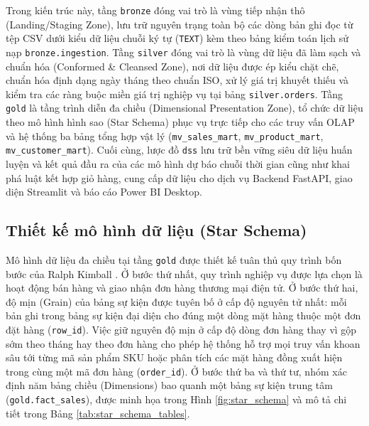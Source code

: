 Trong kiến trúc này, tầng \texttt{bronze} đóng vai trò là vùng tiếp nhận thô (Landing/Staging Zone), lưu trữ nguyên trạng toàn bộ các dòng bản ghi đọc từ tệp CSV dưới kiểu dữ liệu chuỗi ký tự (\texttt{TEXT}) kèm theo bảng kiểm toán lịch sử nạp \texttt{bronze.ingestion}. Tầng \texttt{silver} đóng vai trò là vùng dữ liệu đã làm sạch và chuẩn hóa (Conformed \& Cleansed Zone), nơi dữ liệu được ép kiểu chặt chẽ, chuẩn hóa định dạng ngày tháng theo chuẩn ISO, xử lý giá trị khuyết thiếu và kiểm tra các ràng buộc miền giá trị nghiệp vụ tại bảng \texttt{silver.orders}. Tầng \texttt{gold} là tầng trình diễn đa chiều (Dimensional Presentation Zone), tổ chức dữ liệu theo mô hình hình sao (Star Schema) phục vụ trực tiếp cho các truy vấn OLAP và hệ thống ba bảng tổng hợp vật lý (\texttt{mv\_sales\_mart}, \texttt{mv\_product\_mart}, \texttt{mv\_customer\_mart}). Cuối cùng, lược đồ \texttt{dss} lưu trữ bền vững siêu dữ liệu huấn luyện và kết quả đầu ra của các mô hình dự báo chuỗi thời gian cũng như khai phá luật kết hợp giỏ hàng, cung cấp dữ liệu cho dịch vụ Backend FastAPI, giao diện Streamlit và báo cáo Power BI Desktop.

\subsection{Thiết kế mô hình dữ liệu (Star Schema)}

Mô hình dữ liệu đa chiều tại tầng \texttt{gold} được thiết kế tuân thủ quy trình bốn bước của Ralph Kimball \cite{kimball2013}. Ở bước thứ nhất, quy trình nghiệp vụ được lựa chọn là hoạt động bán hàng và giao nhận đơn hàng thương mại điện tử. Ở bước thứ hai, độ mịn (Grain) của bảng sự kiện được tuyên bố ở cấp độ nguyên tử nhất: mỗi bản ghi trong bảng sự kiện đại diện cho đúng một dòng mặt hàng thuộc một đơn đặt hàng (\texttt{row\_id}). Việc giữ nguyên độ mịn ở cấp độ dòng đơn hàng thay vì gộp sớm theo tháng hay theo đơn hàng cho phép hệ thống hỗ trợ mọi truy vấn khoan sâu tới từng mã sản phẩm SKU hoặc phân tích các mặt hàng đồng xuất hiện trong cùng một mã đơn hàng (\texttt{order\_id}). Ở bước thứ ba và thứ tư, nhóm xác định năm bảng chiều (Dimensions) bao quanh một bảng sự kiện trung tâm (\texttt{gold.fact\_sales}), được minh họa trong Hình \ref{fig:star_schema} và mô tả chi tiết trong Bảng \ref{tab:star_schema_tables}.

